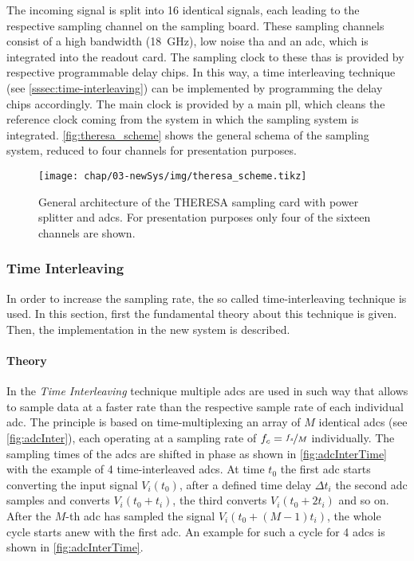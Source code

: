 The incoming signal is split into 16 identical signals, each leading to the respective sampling channel on the sampling board.
These sampling channels consist of a high bandwidth (\SI{18}{\GHz}), low noise \gls{tha} and an \gls{adc}, which is integrated into the readout card.
The sampling clock to these \glspl{tha} is provided by respective programmable delay chips.
In this way, a time interleaving technique (see \autoref{sssec:time-interleaving}) can be implemented by programming the delay chips accordingly. 
The main clock is provided by a main \gls{pll}, which cleans the reference clock coming from the system in which the sampling system is integrated.
\autoref{fig:theresa_scheme} shows the general schema of the sampling system, reduced to four channels for presentation purposes.
\begin{figure}[H]
	\centering
	\texttt{[image: chap/03-newSys/img/theresa\_scheme.tikz]}
	\caption[General architecture of the THERESA sampling card]{General architecture of the THERESA sampling card with power splitter and \glspl{adc}. For presentation purposes only four of the sixteen channels are shown.}
	\label{fig:theresa_scheme}
\end{figure}

\subsubsection{Time Interleaving}\label{sssec:time-interleaving}
In order to increase the sampling rate, the so called time-interleaving technique is used.
In this section, first the fundamental theory about this technique is given.
Then, the implementation in the new system is described.

\paragraph{Theory}
In the \textit{Time Interleaving} technique multiple \glspl{adc} are used in such way that allows to sample data at a faster rate than the respective sample rate of each individual \gls{adc}. 
The principle is based on time-multiplexing an array of $M$ identical \glspl{adc} (see \autoref{fig:adcInter}), each operating at a sampling rate of $f_c = \nicefrac{f_s}{M}$ individually. 
The sampling times of the \glspl{adc} are shifted in phase as shown in \autoref{fig:adcInterTime} with the example of 4 time-interleaved \glspl{adc}.  
At time $t_0$ the first \gls{adc} starts converting the input signal $V_i(t_0)$, after a defined time delay $\Delta t_i$ the second \gls{adc} samples and converts $V_i(t_0 + t_i)$, the third converts $V_i(t_0 + 2t_i)$ and so on. 
After the $M$-th \gls{adc} has sampled the signal $V_i(t_0 + (M-1)t_i)$, the whole cycle starts anew with the first \gls{adc}. \cite{mangrob}
An example for such a cycle for 4 \glspl{adc} is shown in \autoref{fig:adcInterTime}.

